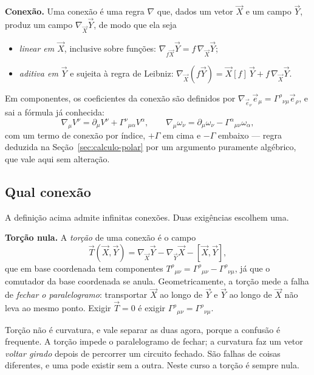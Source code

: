 \documentclass[12pt,a4paper,oneside]{book}
\theoremstyle{rgplain}
\theoremstyle{rgremark}
\begin{document}
\begin{central}
\textbf{Conexão.} Uma conexão é uma regra $\nabla$ que, dados um vetor
$\vec X$ e um campo $\vec Y$, produz um campo $\nabla_{\vec X}\vec Y$, de modo
que ela seja
\begin{itemize}
  \item \emph{linear em $\vec X$}, inclusive sobre funções:
  $\nabla_{f\vec X}\vec Y=f\,\nabla_{\vec X}\vec Y$;
  \item \emph{aditiva em $\vec Y$} e sujeita à regra de Leibniz:
  $\nabla_{\vec X}(f\vec Y)=\vec X[f]\,\vec Y+f\,\nabla_{\vec X}\vec Y$.
\end{itemize}
Em componentes, os coeficientes da conexão são definidos por
$\nabla_{\vec e_\nu}\vec e_\mu=\Gamma^\rho{}_{\nu\mu}\vec e_\rho$, e sai a
fórmula já conhecida:
\begin{equation}
  \nabla_\mu V^\nu=\partial_\mu V^\nu+\Gamma^\nu{}_{\mu\alpha}V^\alpha ,
  \qquad
  \nabla_\mu\omega_\nu=\partial_\mu\omega_\nu-\Gamma^\alpha{}_{\mu\nu}
  \omega_\alpha ,
  \label{eq:nabla-variedade}
\end{equation}
com um termo de conexão por índice, $+\Gamma$ em cima e $-\Gamma$ embaixo ---
regra deduzida na Seção~\ref{sec:calculo-polar} por um argumento puramente
algébrico, que vale aqui sem alteração.
\end{central}

\subsection*{Qual conexão}

A definição acima admite infinitas conexões. Duas exigências escolhem uma.

\textbf{Torção nula.} A \emph{torção} de uma conexão é o campo
\begin{equation}
  \vec T(\vec X,\vec Y)
  =\nabla_{\vec X}\vec Y-\nabla_{\vec Y}\vec X-[\vec X,\vec Y] ,
  \label{eq:torcao}
\end{equation}
que em base coordenada tem componentes
$T^\rho{}_{\mu\nu}=\Gamma^\rho{}_{\mu\nu}-\Gamma^\rho{}_{\nu\mu}$, já que o
comutador da base coordenada se anula. Geometricamente, a torção mede a falha
de \emph{fechar o paralelogramo}: transportar $\vec X$ ao longo de $\vec Y$ e
$\vec Y$ ao longo de $\vec X$ não leva ao mesmo ponto. Exigir $\vec T=0$ é
exigir $\Gamma^\rho{}_{\mu\nu}=\Gamma^\rho{}_{\nu\mu}$.

\begin{atencao}
Torção não é curvatura, e vale separar as duas agora, porque a confusão é
frequente. A torção impede o paralelogramo de fechar; a curvatura faz um vetor
\emph{voltar girado} depois de percorrer um circuito fechado. São falhas de
coisas diferentes, e uma pode existir sem a outra. Neste curso a torção é
sempre nula.
\end{atencao}
\end{document}
